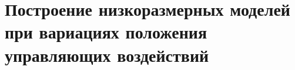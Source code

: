 \chapter{Построение низкоразмерных моделей при вариациях положения управляющих воздействий}\label{ch:ch3}
